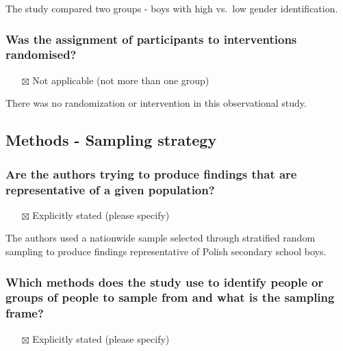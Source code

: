 \documentclass[
  doc, a4paper]{apa7}
\providecommand{\tightlist}{%
  \setlength{\itemsep}{0pt}\setlength{\parskip}{0pt}}
\begin{document}
The study compared two groups - boys with high vs.~low gender identification.

\subsubsection{Was the assignment of participants to interventions randomised?}\label{was-the-assignment-of-participants-to-interventions-randomised}

\begin{itemize}
\tightlist
\item[$\boxtimes$]
  Not applicable (not more than one group)
\end{itemize}

There was no randomization or intervention in this observational study.

\subsection{Methods - Sampling strategy}\label{methods---sampling-strategy}

\subsubsection{Are the authors trying to produce findings that are representative of a given population?}\label{are-the-authors-trying-to-produce-findings-that-are-representative-of-a-given-population}

\begin{itemize}
\tightlist
\item[$\boxtimes$]
  Explicitly stated (please specify)
\end{itemize}

The authors used a nationwide sample selected through stratified random sampling to produce findings representative of Polish secondary school boys.

\subsubsection{Which methods does the study use to identify people or groups of people to sample from and what is the sampling frame?}\label{which-methods-does-the-study-use-to-identify-people-or-groups-of-people-to-sample-from-and-what-is-the-sampling-frame}

\begin{itemize}
\tightlist
\item[$\boxtimes$]
  Explicitly stated (please specify)
\end{itemize}
\end{document}
